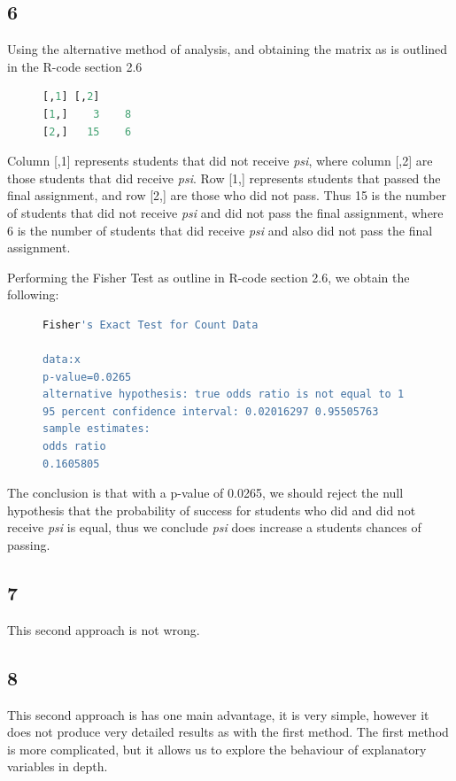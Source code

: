 \documentclass{article}
\begin{document}
    \subsection*{6}
    Using the alternative method of analysis, and obtaining the matrix as is outlined in the R-code section 2.6
        	\begin{figure}[H]
    	\begin{lstlisting}[language=R]
     [,1] [,2]
[1,]    3    8
[2,]   15    6
    	\end{lstlisting}
    \end{figure}
    Column [,1] represents students that did not receive \textit{psi}, where column [,2] are those students that did receive \textit{psi}. Row [1,] represents students that passed the final assignment, and row [2,] are those who did not pass. Thus 15 is the number of students that did not receive \textit{psi} and did not pass the final assignment, where 6 is the number of students that did receive \textit{psi} and also did not pass the final assignment.
    
    Performing the Fisher Test as outline in R-code section 2.6, we obtain the following:
            	\begin{figure}[H]
    	\begin{lstlisting}[language=R]
	Fisher's Exact Test for Count Data

data:x
p-value=0.0265
alternative hypothesis: true odds ratio is not equal to 1
95 percent confidence interval: 0.02016297 0.95505763
sample estimates:
odds ratio 
0.1605805 
    	\end{lstlisting}
    \end{figure}
    The conclusion is that with a p-value of 0.0265, we should reject the null hypothesis that the probability of success for students who did and did not receive \textit{psi} is equal, thus we conclude \textit{psi} does increase a students chances of passing.
    \subsection*{7}
    This second approach is not wrong.
    \subsection*{8}
	This second approach is has one main advantage, it is very simple, however it does not produce very detailed results as with the first method. The first method is more complicated, but it allows us to explore the behaviour of explanatory variables in depth.
\end{document}
